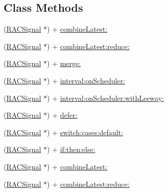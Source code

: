 \subsection*{Class Methods}
\begin{DoxyCompactItemize}
\item 
(\mbox{\hyperlink{interface_r_a_c_signal}{R\+A\+C\+Signal}} $\ast$) + \mbox{\hyperlink{category_r_a_c_signal_07_operations_08_a8a7a563a48665fb1203e2b37db6e5e98}{combine\+Latest\+:}}
\item 
(\mbox{\hyperlink{interface_r_a_c_signal}{R\+A\+C\+Signal}} $\ast$) + \mbox{\hyperlink{category_r_a_c_signal_07_operations_08_a5e4d2db914a14c415646d9fdda131221}{combine\+Latest\+:reduce\+:}}
\item 
(\mbox{\hyperlink{interface_r_a_c_signal}{R\+A\+C\+Signal}} $\ast$) + \mbox{\hyperlink{category_r_a_c_signal_07_operations_08_a37d7e9c259ad5253a1f3ff644a86e52b}{merge\+:}}
\item 
(\mbox{\hyperlink{interface_r_a_c_signal}{R\+A\+C\+Signal}} $\ast$) + \mbox{\hyperlink{category_r_a_c_signal_07_operations_08_a65442f423ebf08b9217f7bb206780a45}{interval\+:on\+Scheduler\+:}}
\item 
(\mbox{\hyperlink{interface_r_a_c_signal}{R\+A\+C\+Signal}} $\ast$) + \mbox{\hyperlink{category_r_a_c_signal_07_operations_08_acd968c129ec1afe3b5bc77db5fc13291}{interval\+:on\+Scheduler\+:with\+Leeway\+:}}
\item 
(\mbox{\hyperlink{interface_r_a_c_signal}{R\+A\+C\+Signal}} $\ast$) + \mbox{\hyperlink{category_r_a_c_signal_07_operations_08_a3f29638c9c7f60928b7a6cbf2fe25d6f}{defer\+:}}
\item 
(\mbox{\hyperlink{interface_r_a_c_signal}{R\+A\+C\+Signal}} $\ast$) + \mbox{\hyperlink{category_r_a_c_signal_07_operations_08_aac7816b22cfdcbe65cd43d99836ba1f5}{switch\+:cases\+:default\+:}}
\item 
(\mbox{\hyperlink{interface_r_a_c_signal}{R\+A\+C\+Signal}} $\ast$) + \mbox{\hyperlink{category_r_a_c_signal_07_operations_08_a67c14dfcf505999bc53632e336f6cb84}{if\+:then\+:else\+:}}
\item 
(\mbox{\hyperlink{interface_r_a_c_signal}{R\+A\+C\+Signal}} $\ast$) + \mbox{\hyperlink{category_r_a_c_signal_07_operations_08_a8a7a563a48665fb1203e2b37db6e5e98}{combine\+Latest\+:}}
\item 
(\mbox{\hyperlink{interface_r_a_c_signal}{R\+A\+C\+Signal}} $\ast$) + \mbox{\hyperlink{category_r_a_c_signal_07_operations_08_a5e4d2db914a14c415646d9fdda131221}{combine\+Latest\+:reduce\+:}}
\item 

\end{DoxyCompactItemize}
